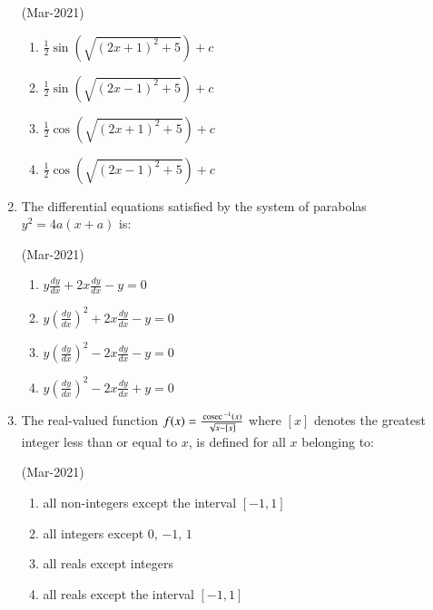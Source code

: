 \documentclass[journal,12pt,onecolumn]{IEEEtran}
\theoremstyle{remark}
\begin{document}
\begin{enumerate}
	\hfill{(Mar-2021)}
	\begin{multicols}{2}
               \begin{enumerate}
    \item $ \frac{1}{2} \sin\left(\sqrt{(2x + 1)^2 + 5}\right) + c $
    \item $ \frac{1}{2} \sin\left(\sqrt{(2x - 1)^2 + 5}\right) + c $
    \item $ \frac{1}{2} \cos\left(\sqrt{(2x + 1)^2 + 5}\right) + c $
    \item $ \frac{1}{2} \cos\left(\sqrt{(2x - 1)^2 + 5}\right) + c $
               \end{enumerate}
	\end{multicols}
       \item
	       The differential equations satisfied by the system of parabolas $ y^2 = 4a(x + a)$ is:

	       	\hfill{(Mar-2021)}
		\begin{multicols}{2}
	       \begin{enumerate}
    \item $ y \frac{dy}{dx} + 2x \frac{dy}{dx} - y = 0 $
    \item $ y \left(\frac{dy}{dx}\right)^2 + 2x \frac{dy}{dx} - y = 0 $
    \item $ y \left(\frac{dy}{dx}\right)^2 - 2x \frac{dy}{dx} - y = 0 $
    \item $ y \left(\frac{dy}{dx}\right)^2 - 2x \frac{dy}{dx} + y = 0 $
               \end{enumerate}
		\end{multicols}
       \item
	       The real-valued function $ f(x) = \frac{\,\text{cosec}\,^{-1}(x)}{\sqrt{x - [x]}}$ where $[x]$ denotes the greatest integer less than or equal to $x$, is defined for all $x$ belonging to:

	       	\hfill{(Mar-2021)}
		\begin{multicols}{1}
	       \begin{enumerate}
    \item all non-integers except the interval $[-1, 1]$
    \item all integers except $0$, $-1$, $1$
    \item all reals except integers
    \item all reals except the interval $[-1, 1]$
               \end{enumerate}
		\end{multicols}














\end{enumerate}
\end{document}
